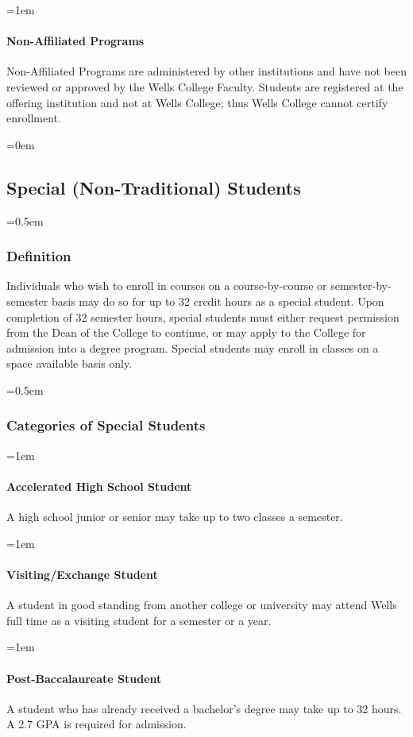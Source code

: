 \documentclass{manual}
\let\oldsubsection\subsection
\renewcommand\subsection{\leftskip=0em\oldsubsection}
\let\oldsubsubsection\subsubsection
\renewcommand\subsubsection{\leftskip=0.5em\oldsubsubsection}
\let\oldparagraph\paragraph
\renewcommand\paragraph{\leftskip=1em\oldparagraph}
\begin{document}
			\paragraph{Non-Affiliated Programs}
			Non-Affiliated Programs are administered by other institutions and have not been reviewed or approved by the Wells College Faculty. Students are registered at the offering institution and not at Wells College; thus Wells College cannot certify enrollment. 

	\subsection{Special (Non-Traditional) Students}\label{sec:NonTraditionalStudents}

		\subsubsection{Definition}

			Individuals who wish to enroll in courses on a course-by-course or semester-by-semester basis may do so for up to 32 credit hours as a special student. Upon completion of 32 semester hours, special students must either request permission from the Dean of the College to continue, or may apply to the College for admission into a degree program. Special students may enroll in classes on a space available basis only.

		\subsubsection{Categories of Special Students}\label{sub:CategoriesOfSpecialStudents}

			\paragraph{Accelerated High School Student} A high school junior or senior may take up to two classes a semester.

			\paragraph{Visiting/Exchange Student} A student in good standing from another college or university may attend Wells full time as a visiting student for a semester or a year.

			\paragraph{Post-Baccalaureate Student} A student who has already received a bachelor's degree may take up to 32 hours. A 2.7 GPA is required for admission. 
\end{document}
